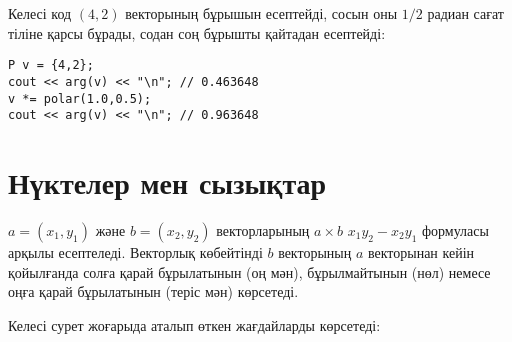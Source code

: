 Келесі код $(4,2)$ векторының бұрышын есептейді,
сосын оны $1/2$ радиан сағат тіліне қарсы бұрады,
содан соң бұрышты қайтадан есептейді:


\begin{lstlisting}
P v = {4,2};
cout << arg(v) << "\n"; // 0.463648
v *= polar(1.0,0.5);
cout << arg(v) << "\n"; // 0.963648
\end{lstlisting}

\section{Нүктелер мен сызықтар}


$a=(x_1,y_1)$ және $b=(x_2,y_2)$ векторларының
 $a \times b$ 
$x_1 y_2 - x_2 y_1$ формуласы арқылы есептеледі.
Векторлық көбейтінді 
$b$ векторының $a$ векторынан кейін қойылғанда 
солға қарай бұрылатынын (оң мән),
бұрылмайтынын (нөл) немесе 
оңға қарай бұрылатынын (теріс мән) көрсетеді.



Келесі сурет жоғарыда аталып өткен жағдайларды көрсетеді:
\begin{center}
\end{center}

